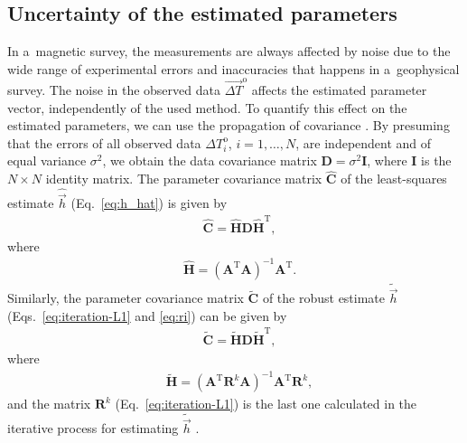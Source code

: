 \documentclass[journal abbreviation, npg]{copernicus}
\begin{document}
\subsection{Uncertainty of the estimated parameters}

In a~magnetic survey, the measurements are always affected by noise due to
the wide range of experimental errors and inaccuracies that happens in
a~geophysical survey. The noise in the observed data $\vec{\Delta
T}^\mathrm{o}$ affects the estimated parameter vector, independently of the
used method. To quantify this effect on the estimated parameters, we can use
the propagation of covariance \citep{bard1973,aster-etal2005}. By presuming
that the errors of all observed data ${\Delta T}^\mathrm{o}_{i}$, $i = 1,
\ldots, N$, are independent and of equal variance $\sigma^{2}$, we obtain the
data covariance matrix $\mathbf{D} = \sigma^{2} \mathbf{I}$, where
$\mathbf{I}$ is the $N \times N$ identity matrix. The parameter covariance
matrix $\hat{\mathbf{C}}$ of the least-squares estimate $\hat{\vec{h}}$
(Eq.~\ref{eq:h_hat}) is given by
\begin{align}
 &
\hat{\mathbf{C}} = \hat{\mathbf{H}}  \mathbf{D}  \hat{\mathbf{H}}^{\mathrm{T}} ,
\label{eq:cov-h-hat}
\end{align}
where
\begin{align}
 &
\hat{\mathbf{H}} = (\mathbf{A}^{\mathrm{T}}\mathbf{A} )^{-1} \mathbf{A}^{\mathrm{T}} .
\label{eq:H-h-hat}
\end{align}
Similarly, the parameter covariance matrix $\tilde{\mathbf{C}}$ of the robust
estimate $\tilde{\vec{h}}$ (Eqs.~\ref{eq:iteration-L1} and \ref{eq:ri}) can
be given by
\begin{align}
 &
\tilde{\mathbf{C}} = \tilde{\mathbf{H}}  \mathbf{D}
\tilde{\mathbf{H}}^{\mathrm{T}} ,
\label{eq:cov-h-tilde}
\end{align}
where
\begin{align}
 &
\tilde{\mathbf{H}} = (\mathbf{A}^{\mathrm{T}} \mathbf{R}^{k} \mathbf{A} )^{-1}
\mathbf{A}^{\mathrm{T}} \mathbf{R}^{k} ,
\label{eq:H-h-tilde}
\end{align}
and the matrix $\mathbf{R}^{k}$ (Eq.~\ref{eq:iteration-L1}) is the last one
calculated in the iterative process for estimating $\tilde{\vec{h}}$
\citep{bard1973,aster-etal2005}.
\end{document}

